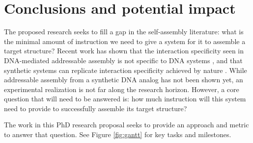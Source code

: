 \documentclass[11pt]{article}   	%
\begin{document}


%
%


\section{Conclusions and potential impact}

The proposed research seeks to fill a gap in the self-assembly literature: what is the minimal amount of instruction we need to give a system for it to assemble a target structure?
Recent work has shown that the interaction specificity seen in DNA-mediated addressable assembly is not specific to DNA systems \cite{Reinhardt_2014_PRL}, and that synthetic systems can replicate interaction specificity achieved by nature \cite{Huntley_2016_PNAS}.
While addressable assembly from a synthetic DNA analog has not been shown yet, an experimental realization is not far along the research horizon.
However, a core question that will need to be answered is: how much instruction will this system need to provide to successfully assemble its target structure?

The work in this PhD research proposal seeks to provide an approach and metric to answer that question. See Figure \ref{fig:gantt} for key tasks and milestones.

%
%
%
\end{document}
